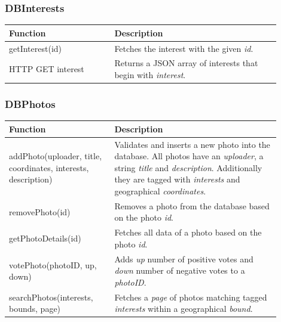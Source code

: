 \subsubsection{DBInterests}
\begin{minipage}{\linewidth}
  \centering
  \setlength{\tabcolsep}{12pt}
  \begin{tabular}{|p{0.35\linewidth}|p{0.55\linewidth}|}
  \hline
  \cellcolor{gray!25} Function & \cellcolor{gray!25} Description \\
  \hline
  getInterest(id) & Fetches the interest with the given \textit{id}. \\
  HTTP GET interest & Returns a JSON array of interests that begin with \textit{interest}. \\
  \hline  
  \end{tabular}
\end{minipage}

\subsubsection{DBPhotos}
\begin{minipage}{\linewidth}
  \centering
  \setlength{\tabcolsep}{12pt}
  \begin{tabular}{|p{0.35\linewidth}|p{0.55\linewidth}|}
  \hline
  \cellcolor{gray!25} Function & \cellcolor{gray!25} Description \\
  \hline
  addPhoto(uploader, title, coordinates, interests, description) & Validates and inserts a new photo into the database. All photos have an \textit{uploader}, a string \textit{title} and \textit{description}. Additionally they are tagged with \textit{interests} and geographical \textit{coordinates}. \\
  removePhoto(id) & Removes a photo from the database based on the photo \textit{id}. \\
  getPhotoDetails(id) & Fetches all data of a photo based on the photo \textit{id}. \\
  votePhoto(photoID, up, down) & Adds \textit{up} number of positive votes and \textit{down} number of negative votes to a \textit{photoID}. \\
  searchPhotos(interests, bounds, page) & Fetches a \textit{page} of photos matching tagged \textit{interests} within a geographical \textit{bound}. \\
  \hline  
  \end{tabular}
\end{minipage}

